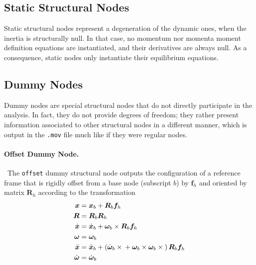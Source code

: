 \documentclass[10pt,dvips,fleqn,subeqn]{report}
\newcommand{\T}[1]{\bm{#1}}
\begin{document}
\subsection{Static Structural Nodes}
\label{sec:nodes:structural nodes:static structural nodes}
Static structural nodes represent a degeneration of the dynamic ones,
when the inertia is structurally null.
In that case, no momentum nor momenta moment definition equations
are instantiated, and their derivatives are always null.
As a consequence, static nodes only instantiate their equilibrium equations.

\subsection{Dummy Nodes}
\label{sec:nodes:structural nodes:dummy nodes}
Dummy nodes are special structural nodes that do not directly 
participate in the analysis.
In fact, they do not provide degrees of freedom; they rather
present information associated to other structural nodes 
in a different manner, which is output in the \texttt{.mov}
file much like if they were regular nodes.



\paragraph{Offset Dummy Node.} \
The \texttt{offset} dummy structural node outputs the configuration
of a reference frame that is rigidly offset from a base node
(subscript $b$) by $\T{f}_h$ and oriented by matrix $\T{R}_h$ according 
to the transformation
\begin{subequations}
\begin{align}
	\T{x} &= \T{x}_b + \T{R}_b \T{f}_h \\
	\T{R} &= \T{R}_b \T{R}_h \\
	\dot{\T{x}} &= \dot{\T{x}}_b + \T{\omega}_b \times \T{R}_b \T{f}_h \\
	\T{\omega} &= \T{\omega}_b \\
	\ddot{\T{x}} &= \ddot{\T{x}}_b + \plbr{
		\dot{\T{\omega}}_b \times{}
		+ \T{\omega}_b \times \T{\omega}_b \times{}
	} \T{R}_b \T{f}_h \\
	\dot{\T{\omega}} &= \dot{\T{\omega}}_b
\end{align}
\end{subequations}
\end{document}
